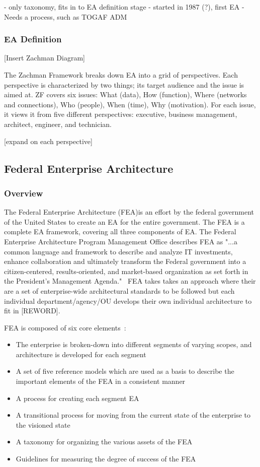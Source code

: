 - only taxonomy, fits in to EA definition stage
- started in 1987 (?), first EA
- Needs a process, such as TOGAF ADM

\subsubsection{EA Definition}

[Insert Zachman Diagram]

The Zachman Framework breaks down EA into a grid of perspectives. Each perspective is characterized by two things; its target audience and the issue is aimed at. ZF covers six issues: What (data), How (function), Where (networks and connections), Who (people), When (time), Why (motivation). For each issue, it views it from five different perspectives: executive, business management, architect, engineer, and technician. 

[expand on each perspective]

\subsection{Federal Enterprise Architecture}
\subsubsection{Overview}
The Federal Enterprise Architecture (FEA)is an effort by the federal government of the United States to create an EA for the entire government. The FEA is a complete EA framework, covering all three components of EA. The Federal Enterprise Architecture Program Management Office describes FEA as "...a common language and framework to describe and analyze IT investments, enhance collaboration and ultimately transform the Federal government into a citizen-centered, results-oriented, and market-based organization as set forth in the President's Management Agenda."~\cite{FederalEnterpriseArchitectureProgramManagementOffice} FEA takes takes an approach where their are a set of enterprise-wide architectural standards to be followed but each individual department/agency/OU develops their own individual architecture to fit in [REWORD].

FEA is composed of six core elements~\cite{sessions2007}:
\begin{itemize}
    \item The enterprise is broken-down into different segments of varying scopes, and architecture is developed for each segment
    \item A set of five reference models which are used as a basis to describe the important elements of the FEA in a consistent manner
    \item A process for creating each segment EA
    \item A transitional process for moving from the current state of the enterprise to the visioned state
    \item A taxonomy for organizing the various assets of the FEA
    \item Guidelines for measuring the degree of success of the FEA
\end{itemize}

